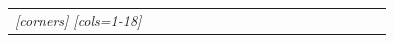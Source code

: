 
\begin{adjustbox}{angle=90}
	\begin{threeparttable}
    \begin{NiceTabular}{@{}>{\it }lll*{15}r@{}}[corners]
			\CodeBefore
			[cols=1-18]
			\Body
			\toprule
			 & & & &&&&&&&&&&&&&&\\
			\cmidrule(rl){4-18}


\end{NiceTabular}
\end{threeparttable}
\end{adjustbox}

